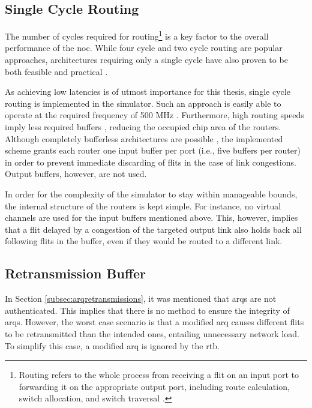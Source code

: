 \subsection{Single Cycle Routing}
The number of cycles required for routing\footnote{Routing refers to the whole process from receiving a flit on an input port to forwarding it on the
appropriate output port, including route calculation, switch allocation, and switch traversal \cite[see][2]{routinglectureutah}.} is a key factor to the
overall performance of the \gls{noc}. While four cycle \cite[e.g.][]{routinglectureutah} and two cycle routing \cite[e.g.][]{lu11nocrouter} are
popular approaches, architectures requiring only a single cycle have also proven to be both feasible and practical
\cites{hayenga09scarab}{ved17routeonfly}.

As achieving low latencies is of utmost importance for this thesis, single cycle routing is implemented in the simulator. Such an approach is easily
able to operate at the required frequency of 500 MHz \cite[7]{hayenga09scarab}. Furthermore, high routing speeds imply less required buffers
\cite[1]{ved17routeonfly}, reducing the occupied chip area of the routers. Although completely bufferless architectures are possible
\cite{hayenga09scarab}, the implemented scheme grants each router one input buffer per port (i.e., five buffers per router) in order to prevent
immediate discarding of flits in the case of link congestions. Output buffers, however, are not used.

In order for the complexity of the simulator to stay within manageable bounds, the internal structure of the routers is kept simple. For instance, no
virtual channels are used for the input buffers mentioned above. This, however, implies that a flit delayed by a congestion of the targeted output
link also holds back all following flits in the buffer, even if they would be routed to a different link.

\subsection{Retransmission Buffer}
In Section \ref{subsec:arqretransmissions}, it was mentioned that \glspl{arq} are not authenticated. This implies that there is no method to ensure
the integrity of \glspl{arq}. However, the worst case scenario is that a modified \gls{arq} causes different flits to be retransmitted than the
intended ones, entailing unnecessary network load. To simplify this case, a modified \gls{arq} is ignored by the \gls{rtb}.

